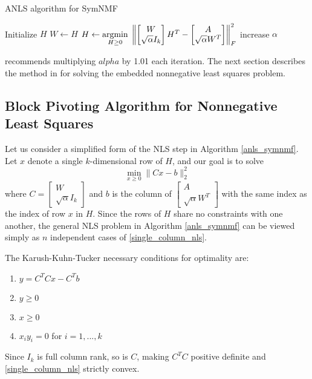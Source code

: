 \begin{algorithm}
\caption{ANLS algorithm for SymNMF}
\label{anls_symnmf}
\begin{algorithmic}[1]
\State Initialize $H$
\Repeat
  \State $W \gets H$
  \State $H \gets \underset{H \geq 0}{\mathrm{arg min}}\;
    \left\lVert \begin{bmatrix} W \\ \sqrt{\alpha} I_k \end{bmatrix} H^T
         - \begin{bmatrix} A \\ \sqrt{\alpha} W^T \end{bmatrix} \right\rVert_F^2$
  \State increase $\alpha$
\end{algorithmic}
\end{algorithm}

\cite{Kuang:15} recommends multiplying $alpha$ by 1.01 each iteration.
The next section describes the method in \cite{Kim:11} for solving the
embedded nonnegative least squares problem.

\subsection{Block Pivoting Algorithm for Nonnegative Least Squares}
Let us consider a simplified form of the NLS step in Algorithm
\ref{anls_symnmf}. Let $x$ denote a single $k$-dimensional row of $H$,
and our goal is to solve
\begin{equation} \label{single_column_nls}
\min_{x \geq 0} \| C x - b \|_2^2
\end{equation}
where $C = \begin{bmatrix} W \\ \sqrt{\alpha} I_k \end{bmatrix}$ and
$b$ is the column of
$\begin{bmatrix} A \\ \sqrt{\alpha} W^T \end{bmatrix}$ with the same
index as the index of row $x$ in $H$. Since the rows of $H$ share no
constraints with one another, the general NLS problem in Algorithm
\ref{anls_symnmf} can be viewed simply as $n$ independent cases of
\ref{single_column_nls}.

The Karush-Kuhn-Tucker necessary conditions for optimality are:
\begin{enumerate}
\item
$y = C^T C x - C^T b$
\item
$y \geq 0$
\item
$x \geq 0$
\item
$x_i y_i = 0$ for $i = 1, ..., k$
\end{enumerate}
Since $I_k$ is full column rank, so is $C$, making $C^T C$ positive
definite and \ref{single_column_nls} strictly convex.

